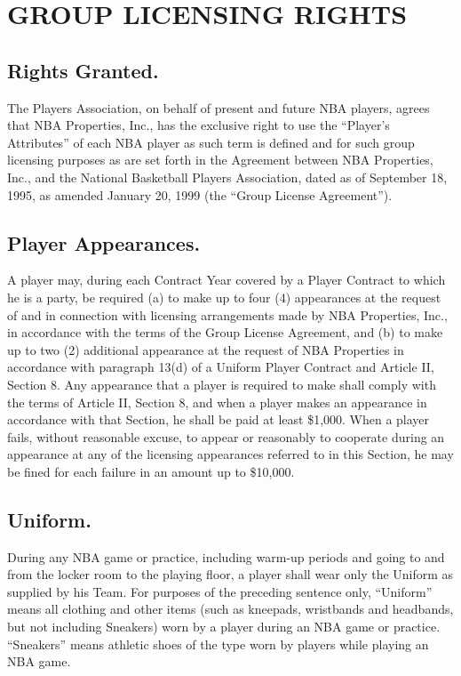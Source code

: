 \documentclass[
]{book}
\begin{document}
\hypertarget{group-licensing-rights}{%
\chapter{GROUP LICENSING RIGHTS}\label{group-licensing-rights}}

\hypertarget{rights-granted.}{%
\section{Rights Granted.}\label{rights-granted.}}

The Players Association, on behalf of present and future NBA players, agrees that NBA Properties, Inc., has the exclusive right to use the ``Player's Attributes'' of each NBA player as such term is defined and for such group licensing purposes as are set forth in the Agreement between NBA Properties, Inc., and the National Basketball Players Association, dated as of September 18, 1995, as amended January 20, 1999 (the ``Group License Agreement'').

\hypertarget{player-appearances.}{%
\section{Player Appearances.}\label{player-appearances.}}

A player may, during each Contract Year covered by a Player Contract to which he is a party, be required (a) to make up to four (4) appearances at the request of and in connection with licensing arrangements made by NBA Properties, Inc., in accordance with the terms of the Group License Agreement, and (b) to make up to two (2) additional appearance at the request of NBA Properties in accordance with paragraph 13(d) of a Uniform Player Contract and Article II, Section 8. Any appearance that a player is required to make shall comply with the terms of Article II, Section 8, and when a player makes an appearance in accordance with that Section, he shall be paid at least \$1,000. When a player fails, without reasonable excuse, to appear or reasonably to cooperate during an appearance at any of the licensing appearances referred to in this Section, he may be fined for each failure in an amount up to \$10,000.

\hypertarget{uniform.}{%
\section{Uniform.}\label{uniform.}}

During any NBA game or practice, including warm-up periods and going to and from the locker room to the playing floor, a player shall wear only the Uniform as supplied by his Team. For purposes of the preceding sentence only, ``Uniform'' means all clothing and other items (such as kneepads, wristbands and headbands, but not including Sneakers) worn by a player during an NBA game or practice. ``Sneakers'' means athletic shoes of the type worn by players while playing an NBA game.
\end{document}
